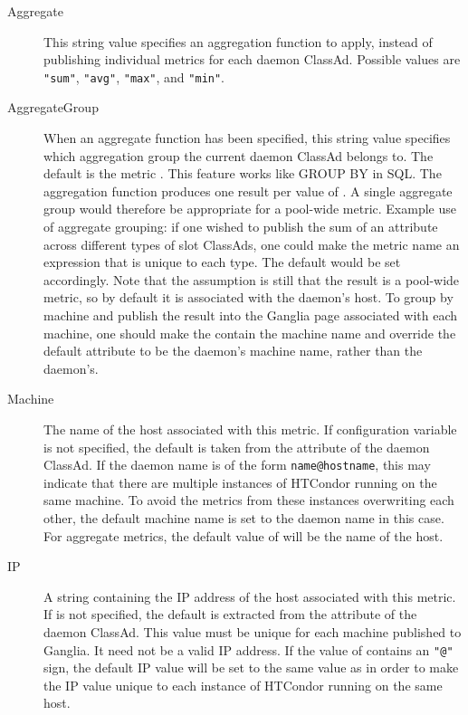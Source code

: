\begin{description}
  \item[Aggregate] This string value specifies an aggregation function
    to apply, instead of publishing individual metrics for each daemon
    ClassAd.  Possible values are \verb|"sum"|, \verb|"avg"|, \verb|"max"|,
    and \verb|"min"|.

  \item[AggregateGroup] When an aggregate function has been specified,
    this string value specifies which aggregation group the current
    daemon ClassAd belongs to.  The default is the metric .  This
    feature works like GROUP BY in SQL.  The aggregation function
    produces one result per value of .  A single
    aggregate group would therefore be appropriate for a pool-wide
    metric.  Example use of aggregate grouping: if one wished to
    publish the sum of an attribute across different types of slot
    ClassAds, one could make the metric name an expression that is unique
    to each type.  The default  would be set
    accordingly.  Note that the assumption is still that the result
    is a pool-wide metric, so by default it is associated with the
     daemon's host.
    To group by machine and publish the result into
    the Ganglia page associated with each machine, one should make
    the  contain the machine name and override
    the default  attribute to be the daemon's machine
    name, rather than the  daemon's.

  \item[Machine] The name of the host associated with this metric.  
    If configuration variable
     is not specified, 
    the default
    is taken from the  attribute of the daemon ClassAd.
    If the daemon name is of the form \verb|name@hostname|, this may
    indicate that there are multiple instances of HTCondor running on
    the same machine.  To avoid the metrics from these instances
    overwriting each other, the default machine name is set to the
    daemon name in this case.  For aggregate metrics, the default
    value of  will be the name of the  host.

  \item[IP] A string containing the IP address of the host associated
    with this metric.  If  is not
    specified, the default is extracted from the 
    attribute of the daemon ClassAd.  This value must be unique for each
    machine published to Ganglia.  It need not be a valid IP address.
    If the value of  contains an \verb|"@"| sign, the
    default IP value will be set to the same value as 
    in order to make the IP value unique to each instance of HTCondor
    running on the same host.

  \end{description}
